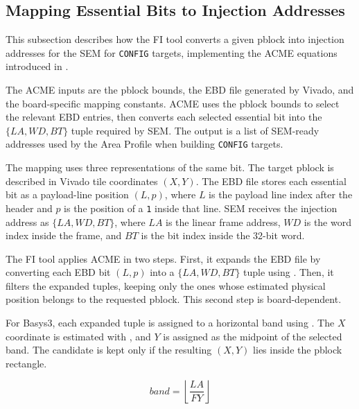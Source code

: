 \subsection{Mapping Essential Bits to Injection Addresses}
\label{chap8:fi_acme_impl}

This subsection describes how the \ac{FI} tool converts a given pblock into injection addresses for the \ac{SEM} for \texttt{CONFIG} targets, implementing the \ac{ACME} equations introduced in . 

The \ac{ACME} inputs are the pblock bounds, the \ac{EBD} file generated by Vivado, and the board-specific mapping constants. \ac{ACME} uses the pblock bounds to select the relevant \ac{EBD} entries, then converts each selected essential bit into the \(\{LA,WD,BT\}\) tuple required by \ac{SEM}. The output is a list of \ac{SEM}-ready addresses used by the Area Profile when building \texttt{CONFIG} targets.

The mapping uses three representations of the same bit. The target pblock is described in Vivado tile coordinates \((X,Y)\). The \ac{EBD} file stores each essential bit as a payload-line position \((L,p)\), where \(L\) is the payload line index after the header and \(p\) is the position of a \texttt{1} inside that line. \ac{SEM} receives the injection address as \(\{LA,WD,BT\}\), where \(LA\) is the linear frame address, \(WD\) is the word index inside the frame, and \(BT\) is the bit index inside the 32-bit word.

The \ac{FI} tool applies \ac{ACME} in two steps. First, it expands the \ac{EBD} file by converting each \ac{EBD} bit \((L,p)\) into a \(\{LA,WD,BT\}\) tuple using . Then, it filters the expanded tuples, keeping only the ones whose estimated physical position belongs to the requested pblock. This second step is board-dependent.

For Basys3, each expanded tuple is assigned to a horizontal band using . The \(X\) coordinate is estimated with , and \(Y\) is assigned as the midpoint of the selected band. The candidate is kept only if the resulting \((X,Y)\) lies inside the pblock rectangle.

\begin{equation}
  band = \left\lfloor \frac{LA}{FY} \right\rfloor
  \label{eq:basys3_band_from_la}
\end{equation}

